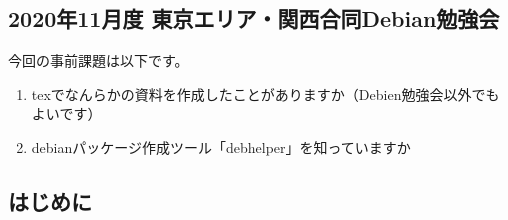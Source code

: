 \documentclass[mingoth,a4paper]{jsarticle}
\begin{document}

\subsection{2020年11月度 東京エリア・関西合同Debian勉強会}



今回の事前課題は以下です。

\begin{enumerate}
\item texでなんらかの資料を作成したことがありますか（Debien勉強会以外でもよいです）
\item debianパッケージ作成ツール「debhelper」を知っていますか
\end{enumerate}


\begin{multicols}{2}
{\small

}
\end{multicols}

%
%
%
%




\label{sec:debmtg2020howtoprepare}

\subsection{はじめに}
\end{document}
